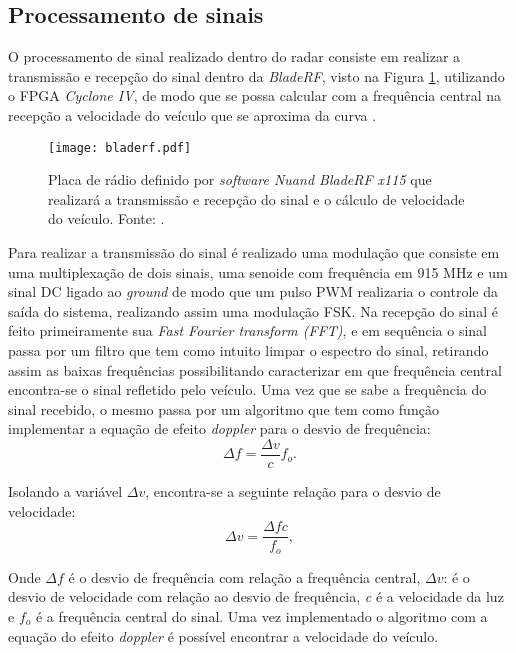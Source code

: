 \subsection{Processamento de sinais}
O processamento de sinal realizado dentro do radar consiste em realizar a transmissão e recepção do sinal dentro da \emph{BladeRF}, visto na Figura \ref{bladerf}, utilizando o FPGA \emph{Cyclone IV}, de modo que se possa calcular com a frequência central na recepção a velocidade do veículo que se aproxima da curva \cite{bladerf}. 
\begin{figure}[H]
    \centering
   \texttt{[image: bladerf.pdf]}
   \caption{Placa de rádio definido por \emph{software Nuand BladeRF x115} que realizará a transmissão e recepção do sinal e o cálculo de velocidade do veículo. Fonte: \cite{bladex115}.}
   \label{bladerf}
    \end{figure}
Para realizar a transmissão do sinal é realizado uma modulação que consiste em uma multiplexação de dois sinais, uma senoide com frequência em 915 MHz e um sinal DC ligado ao \emph{ground} de modo que um pulso PWM realizaria o controle da saída do sistema, realizando assim uma modulação FSK.
Na recepção do sinal é feito primeiramente sua \emph{Fast Fourier transform (FFT)}, e em sequência o sinal passa por um filtro que tem como intuito limpar o espectro do sinal, retirando assim as baixas frequências possibilitando caracterizar em que frequência central encontra-se o sinal refletido pelo veículo. Uma vez que se sabe a frequência do sinal recebido, o mesmo passa por um algoritmo que tem como função implementar a equação de efeito \emph{doppler} para o desvio de frequência:
\begin{equation}\label{freq_desv}
  \Delta f = \frac{\Delta v}{c}f_o.
\end{equation}

Isolando a variável $\Delta v$, encontra-se a seguinte relação para o desvio de velocidade:
\begin{equation}\label{vel}
  \Delta v = \frac{\Delta f c}{f_o},
\end{equation}

Onde $\Delta f$ é o desvio de frequência com relação a frequência central, $\Delta v$: é o desvio de velocidade com relação ao desvio de frequência, \emph{c} é a velocidade da luz e $f_o$ é a frequência central do sinal. Uma vez implementado o algoritmo com a equação do efeito \emph{doppler} é possível encontrar a velocidade do veículo.
